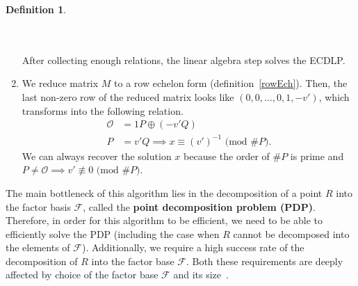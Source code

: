 \documentclass[thesis=M,english]{FITthesis}[2012/10/20]
\theoremstyle{remark}
\theoremstyle{definition}
\newtheorem{DF}{Definition}[section]
\begin{document}
\begin{DF}
\begin{enumerate}
\\ \\
\noindent After collecting enough relations, the linear algebra step solves the ECDLP.
\item We reduce matrix $M$ to a row echelon form (definition~\ref{rowEch}). Then, the last non-zero row of the reduced matrix looks like $(0,0,\ldots, 0, 1, -v')$, which transforms into the following relation.
\begin{align*}
\mathcal{O}  &= 1P \oplus (-v'Q) \\
P &= v'Q \implies x \equiv (v')^{-1} \text{ (mod $\#P$)}.
\end{align*}
We can always recover the solution $x$ because the order of $\#P$ is prime and $P \neq \mathcal{O} \implies v' \not\equiv 0 \text{ (mod $\#P$)}$.
\end{enumerate}
\end{DF}
\noindent The main bottleneck of this algorithm lies in the decomposition of a point $R$ into the factor basis $\mathcal{F}$, called the \textbf{point decomposition problem (PDP)}. Therefore, in order for this algorithm to be efficient, we need to be able to efficiently solve the PDP (including the case when $R$ cannot be decomposed into the elements of $\mathcal{F}$). Additionally, we require a high success rate of the decomposition of $R$ into the factor base $\mathcal{F}$. Both these requirements are deeply affected by choice of the factor base $\mathcal{F}$ and its size~\cite{amadori17}. \\ 
\end{document}
